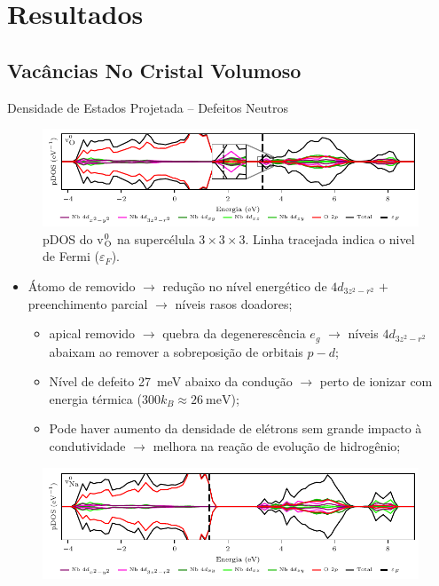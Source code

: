\section{Resultados}

\subsection{Vacâncias No Cristal Volumoso}
\begin{frame}[allowframebreaks]{Densidade de Estados Projetada -- Defeitos Neutros}
	\begin{figure}[t]
		\centering
		\includegraphics{../floats/pdos_vac/pdos_neutral_d_separated_333_vO.pdf}
		\caption{pDOS do v$_{\ce{O}}^0$ na supercélula $3\times3\times3$. Linha tracejada indica o nivel de Fermi ($\varepsilon_F$).\label{fig:pdosNeuVac_vO}}
	\end{figure}
	\begin{itemize}
		\item Átomo de  removido $\to$ redução no nível energético de  $4d_{3z^2-r^2}$ $+$ preenchimento parcial $\to$ \alert{níveis rasos doadores};
		\begin{itemize}
			\item {} apical removido $\to$ quebra da degenerescência $e_g$ $\to$ níveis  $4d_{3z^2-r^2}$ abaixam ao remover a sobreposição de orbitais $p-d$;
			\item Nível de defeito \SI{27}{\milli\electronvolt} abaixo da condução $\to$ perto de ionizar com energia térmica ($300 k_B \approx \SI{26}{\milli\electronvolt}$);
			\item Pode haver \alert{aumento da densidade de elétrons} sem grande impacto à condutividade $\to$ melhora na reação de evolução de hidrogênio;
		\end{itemize}
	\end{itemize}\framebreak
	\begin{figure}[t]
		\centering
		\includegraphics{../floats/pdos_vac/pdos_neutral_d_separated_333_vNa.pdf}

\end{figure}
\end{frame}
